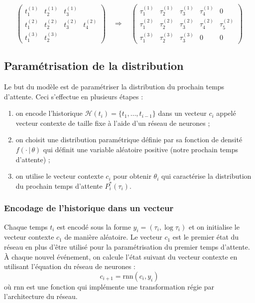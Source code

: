 \documentclass{article}
\theoremstyle{definition}
\theoremstyle{remark}
\begin{document}
$$\begin{pmatrix}
t_1^{(1)} & t_2^{(1)} & t_3^{(1)} \\
t_1^{(2)} & t_2^{(2)} & t_3^{(2)} & t_4^{(2)} \\
t_1^{(3)} & t_2^{(3)}
\end{pmatrix}
\quad \Longrightarrow \quad
\begin{pmatrix}
\tau_1^{(1)} & \tau_2^{(1)} & \tau_3^{(1)} & \tau_4^{(1)} & 0 \\
\tau_1^{(2)} & \tau_2^{(2)} & \tau_3^{(2)} & \tau_4^{(2)} & \tau_5^{(2)} \\
\tau_1^{(3)} & \tau_2^{(3)} & \tau_3^{(3)} & 0 & 0
\end{pmatrix}$$

\subsection{Paramétrisation de la distribution}

Le but du modèle est de paramétriser la distribution du prochain
temps d'attente. Ceci s'effectue en plusieurs étapes :
\begin{enumerate}
\item on encode l'historique $\mathcal{H}(t_i) = \{t_1, \dots, t_{i-1}\}$
dans un vecteur $c_i$ appelé vecteur contexte de taille fixe à l'aide
d'un réseau de neurones ;
\item on choisit une distribution paramétrique définie par sa fonction
de densité $f(\cdot \, |\,  \theta)$ qui définit une variable aléatoire
positive (notre prochain temps d'attente) ;
\item on utilise le vecteur contexte $c_i$ pour obtenir $\theta_i$ qui
caractérise la distribution du prochain temps d'attente $P^*_i(\tau_i)$.
\end{enumerate}

\subsubsection{Encodage de l'historique dans un vecteur}

Chaque temps $t_i$ est encodé sous la forme $y_i = (\tau_i, \log \tau_i)$ et
on initialise le vecteur contexte $c_1$ de manière aléatoire. Le vecteur
$c_1$ est le premier état du réseau en plus d'être utilisé pour la
paramétrisation du premier temps d'attente. À chaque nouvel événement,
on calcule l'état suivant du vecteur contexte en utilisant l'équation
du réseau de neurones :
$$c_{i+1} = \text{rnn}(c_i, y_i)$$ où rnn est une fonction
qui implémente une transformation régie par l'architecture du réseau.
\end{document}
